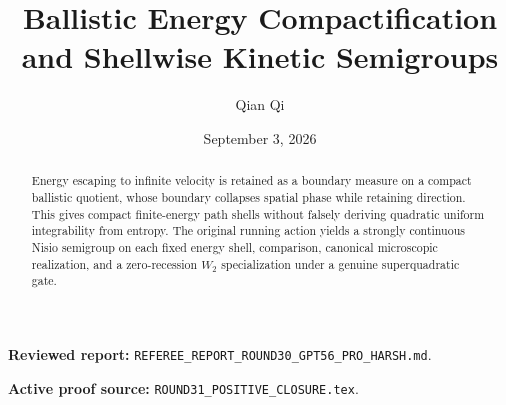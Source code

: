 \documentclass[11pt,reqno]{amsart}
\title[B4 Round 31 revision]{Ballistic Energy Compactification and Shellwise Kinetic Semigroups}
\author{Qian Qi}
\date{September 3, 2026}
\begin{document}
\begin{abstract}
Energy escaping to infinite velocity is retained as a boundary measure on a compact ballistic quotient, whose boundary collapses spatial phase while retaining direction.  This gives compact finite-energy path shells without falsely deriving quadratic uniform integrability from entropy.  The original running action yields a strongly continuous Nisio semigroup on each fixed energy shell, comparison, canonical microscopic realization, and a zero-recession $W_2$ specialization under a genuine superquadratic gate.
\end{abstract}
\maketitle
\noindent\textbf{Reviewed report:} \texttt{REFEREE\_REPORT\_ROUND30\_GPT56\_PRO\_HARSH.md}.\par
\noindent\textbf{Active proof source:} \texttt{ROUND31\_POSITIVE\_CLOSURE.tex}.\par

\end{document}
